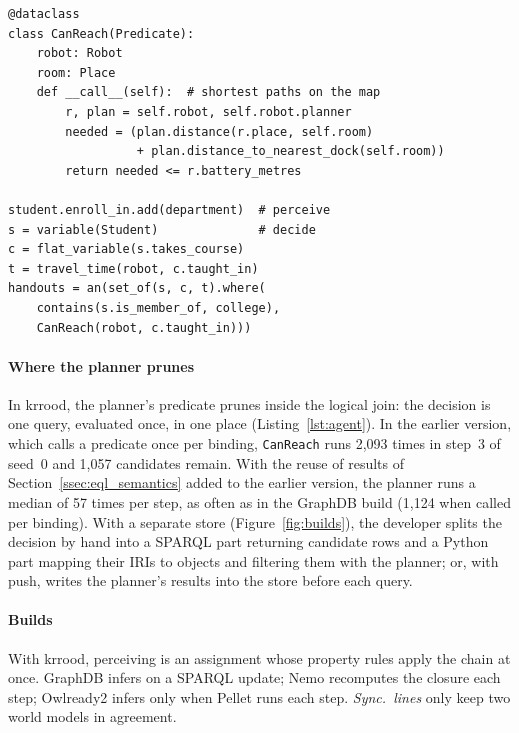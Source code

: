 \documentclass[sigconf,anonymous]{aamas}
\begin{document}
\begin{lstlisting}[style=eql, float=t, caption={The robot's planner as a predicate, \texttt{CanReach}, and a step that perceives by assignment and decides by a query.}, label={lst:agent}]
@dataclass
class CanReach(Predicate):
    robot: Robot
    room: Place
    def __call__(self):  # shortest paths on the map
        r, plan = self.robot, self.robot.planner
        needed = (plan.distance(r.place, self.room)
                  + plan.distance_to_nearest_dock(self.room))
        return needed <= r.battery_metres

student.enroll_in.add(department)  # perceive
s = variable(Student)              # decide
c = flat_variable(s.takes_course)
t = travel_time(robot, c.taught_in)
handouts = an(set_of(s, c, t).where(
    contains(s.is_member_of, college),
    CanReach(robot, c.taught_in)))
\end{lstlisting}





\paragraph{Where the planner prunes}
In \ac{krrood}, the planner's predicate prunes inside the logical join: the decision is one query, evaluated once, in one place (Listing~\ref{lst:agent}). In the earlier version, which calls a predicate once per binding, \texttt{CanReach} runs 2,093 times in step~3 of seed~0 and 1,057 candidates remain. With the reuse of results of Section~\ref{ssec:eql_semantics} added to the earlier version, the planner runs a median of 57 times per step, as often as in the GraphDB build (1,124 when called per binding). With a separate store (Figure~\ref{fig:builds}), the developer splits the decision by hand into a SPARQL part returning candidate rows and a Python part mapping their IRIs to objects and filtering them with the planner; or, with push, writes the planner's results into the store before each query.

\paragraph{Builds}
With \ac{krrood}, perceiving is an assignment whose property rules apply the chain at once. GraphDB infers on a SPARQL update; Nemo recomputes the closure each step; Owlready2 infers only when Pellet runs each step. \emph{Sync.\ lines} only keep two world models in agreement.
\end{document}
